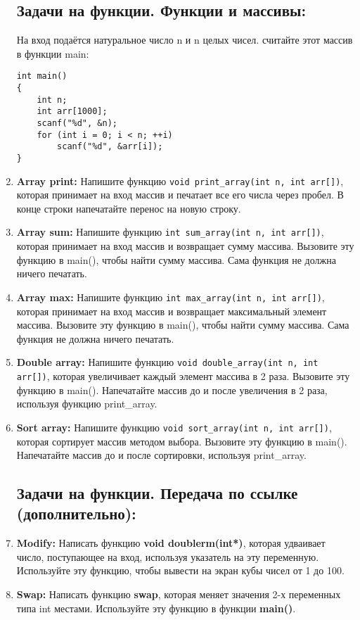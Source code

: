 \documentclass{article}
\begin{document}
\begin{enumerate}
\subsection*{Задачи на функции. Функции и массивы:}
На вход подаётся натуральное число n и n целых чисел. считайте этот массив в функции main:
\begin{lstlisting}
int main()
{
	int n;
	int arr[1000];
	scanf("%d", &n);
	for (int i = 0; i < n; ++i)
		scanf("%d", &arr[i]);
}
\end{lstlisting}
\item \textbf{Array print:} Напишите функцию \texttt{void print\_array(int n, int arr[])}, которая принимает на вход массив и печатает все его числа через пробел. В конце строки напечатайте перенос на новую строку.
\item \textbf{Array sum:} Напишите функцию \texttt{int sum\_array(int n, int arr[])}, которая принимает на вход массив и возвращает сумму массива. Вызовите эту функцию в main(), чтобы найти сумму массива. Сама функция не должна ничего печатать.
\item \textbf{Array max:} Напишите функцию \texttt{int max\_array(int n, int arr[])}, которая принимает на вход массив и возвращает максимальный элемент массива. Вызовите эту функцию в main(), чтобы найти сумму массива. Сама функция не должна ничего печатать.
\item \textbf{Double array:} Напишите функцию \texttt{void double\_array(int n, int arr[])}, которая увеличивает каждый элемент массива в 2 раза. Вызовите эту функцию в main(). Напечатайте массив до и после увеличения в 2 раза, используя функцию print\_array.
\item \textbf{Sort array:} Напишите функцию \texttt{void sort\_array(int n, int arr[])}, которая сортирует массив методом выбора. Вызовите эту функцию в main(). Напечатайте массив до и после сортировки, используя print\_array.

\subsection*{Задачи на функции. Передача по ссылке (дополнительно):}
\item \textbf{Modify:} Написать функцию \textbf{void doublerm(int*)}, которая удваивает число, поступающее на вход, используя указатель на эту переменную. Используйте эту функцию, чтобы вывести на экран кубы чисел от 1 до 100.
\item \textbf{Swap:} Написать функцию \textbf{swap}, которая меняет значения 2-х переменных типа int местами. Используйте эту функцию в функции \textbf{main()}.



\end{enumerate}
\end{document}
